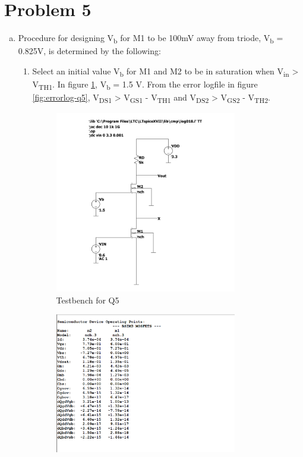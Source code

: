 \documentclass{article}
\begin{document}
\section{Problem 5}
\label{sec:org956c3e7}
\begin{enumerate}[(a)]
\item Procedure for designing V\textsubscript{b} for M1 to be 100mV away from triode, V\textsubscript{b} = 0.825V, is determined by the following:
\begin{enumerate}[1.]
\item Select an initial value V\textsubscript{b} for M1 and M2 to be in saturation when V\textsubscript{in} > V\textsubscript{TH1}. In figure \ref{fig:testbench-q5}, V\textsubscript{b} = 1.5 V.
From the error logfile in figure \ref{fig:errorlog-q5}, V\textsubscript{DS1} > V\textsubscript{GS1} - V\textsubscript{TH1} and V\textsubscript{DS2} > V\textsubscript{GS2} - V\textsubscript{TH2}.
\begin{figure}[H]
\centering
\includegraphics[width=300px]{img/q5/testbench-q5.pdf}
\caption{\label{fig:testbench-q5}Testbench for Q5}
\end{figure}
\begin{figure}[H]
\centering
\includegraphics[width=300px]{img/q5/errorlog-q5.png}

\end{figure}
\end{enumerate}
\end{enumerate}
\end{document}
